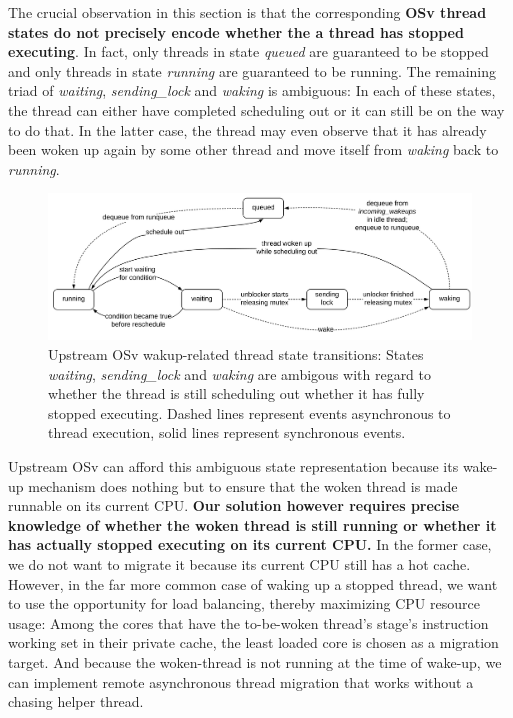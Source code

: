 \documentclass[12pt,a4paper]{book}
\begin{document}
The crucial observation in this section is that the corresponding \textbf{OSv thread states do not precisely encode whether the a thread has stopped executing}.
In fact, only threads in state \textit{queued} are guaranteed to be stopped and only threads in state \textit{running} are guaranteed to be running.
The remaining triad of \textit{waiting}, \textit{sending\_lock} and \textit{waking} is ambiguous:
In each of these states, the thread can either have completed scheduling out or it can still be on the way to do that.
In the latter case, the thread may even observe that it has already been woken up again by some other thread and move itself from \textit{waking} back to \textit{running}.

\begin{figure}
    \centering
    \includegraphics[width=\textwidth]{fig_build/state_chart_pre_spread}
    \caption{Upstream OSv wakup-related thread state transitions: States \textit{waiting}, \textit{sending\_lock} and \textit{waking} are ambigous with regard to whether the thread is still scheduling out whether it has fully stopped executing.
    Dashed lines represent events asynchronous to thread execution, solid lines represent synchronous events.}
    \label{fig:di:wake:upstreamstates}
\end{figure}

Upstream OSv can afford this ambiguous state representation because its wake-up mechanism does nothing but to ensure that the woken thread is made runnable on its current CPU.
\textbf{Our solution however requires precise knowledge of whether the woken thread is still running or whether it has actually stopped executing on its current CPU.}
In the former case, we do not want to migrate it because its current CPU still has a hot cache.
However, in the far more common case of waking up a stopped thread, we want to use the opportunity for load balancing, thereby maximizing CPU resource usage:
Among the cores that have the to-be-woken thread's stage's instruction working set in their private cache, the least loaded core is chosen as a migration target.
And because the woken-thread is not running at the time of wake-up, we can implement remote asynchronous thread migration that works without a chasing helper thread.
\end{document}
